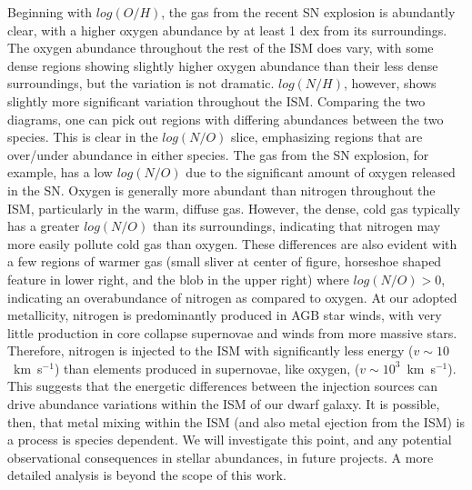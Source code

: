 \documentclass[twocolumn]{aastex61}
\begin{document}
Beginning with $log(O/H)$, the gas from the recent SN explosion is abundantly clear, with a higher oxygen abundance by at least 1 dex from its surroundings. The oxygen abundance throughout the rest of the ISM does vary, with some dense regions showing slightly higher oxygen abundance than their less dense surroundings, but the variation is not dramatic. $log(N/H)$, however, shows slightly more significant variation throughout the ISM. Comparing the two diagrams, one can pick out regions with differing abundances between the two species. This is clear in the $log(N/O)$ slice, emphasizing regions that are over/under abundance in either species. The gas from the SN explosion, for example, has a low $log(N/O)$ due to the significant amount of oxygen released in the SN. Oxygen is generally more abundant than nitrogen throughout the ISM, particularly in the warm, diffuse gas. However, the dense, cold gas typically has a greater $log(N/O)$ than its surroundings, indicating that nitrogen may more easily pollute cold gas than oxygen. These differences are also evident with a few regions of warmer gas (small sliver at center of figure, horseshoe shaped feature in lower right, and the blob in the upper right) where $log(N/O) > 0$, indicating an overabundance of nitrogen as compared to oxygen. At our adopted metallicity, nitrogen is predominantly produced in AGB star winds, with very little production in core collapse supernovae and winds from more massive stars. Therefore, nitrogen is injected to the ISM with significantly less energy ($v \sim 10$~km~s$^{-1}$) than elements produced in supernovae, like oxygen, ($v\sim 10^3$~km~s$^{-1}$). This suggests that the energetic differences between the injection sources can drive abundance variations within the ISM of our dwarf galaxy. It is possible, then, that metal mixing within the ISM (and also metal ejection from the ISM) is a process is species dependent. We will investigate this point, and any potential observational consequences in stellar abundances, in future projects. A more detailed analysis is beyond the scope of this work. 

\end{document}
